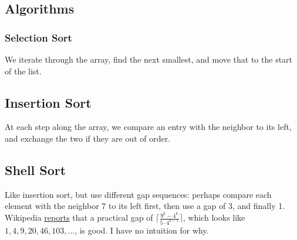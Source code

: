 \subsection{Algorithms}

\subsubsection{Selection Sort}

We iterate through the array, find the next smallest, and move that to the start
of the list.

\subsection{Insertion Sort}

At each step along the array, we compare an entry with the neighbor to its left,
and exchange the two if they are out of order.

\subsection{Shell Sort}
Like insertion sort, but use different gap sequences: perhaps compare each
element with the neighbor 7 to its left first, then use a gap of 3, and 
finally 1.  Wikipedia 
\href{http://en.wikipedia.org/wiki/Shellsort#Gap_sequences}{reports}
that a practical gap of $\lceil \frac{9^k - 4^k}{5 \cdot 4^{k - 1}} \rceil$,
which looks like $1, 4, 9, 20, 46, 103, \ldots$, is good. I have no intuition
for why.
